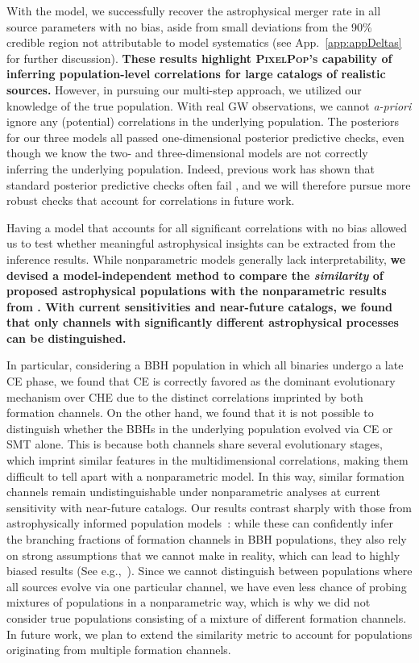 \begin{refsection}
With the \Hybrid model, we successfully recover the astrophysical merger rate in all source parameters with no bias, aside from small deviations from the 90\% credible region not attributable to model systematics (see App.~\ref{app:appDeltas} for further discussion). \textbf{These results highlight \textsc{PixelPop's} capability of inferring population-level correlations for large catalogs of realistic sources.} However, in pursuing our multi-step approach, we utilized our knowledge of the true population. With real \ac{GW} observations, we cannot \textit{a-priori} ignore any (potential) correlations in the underlying population. The posteriors for our three models all passed one-dimensional posterior predictive checks, even though we know the two- and three-dimensional \PixelPop models are not correctly inferring the underlying population. Indeed, previous work has shown that standard posterior predictive checks often fail \citep{Romero-Shaw:2022ctb, Miller:2024sui}, and we will therefore pursue more robust checks that account for correlations in future work.

Having a model that accounts for all significant correlations with no bias allowed us to test whether meaningful astrophysical insights can be extracted from the inference results. While nonparametric models generally lack interpretability, \textbf{we devised a model-independent method to compare the \textit{similarity} of proposed astrophysical populations with the nonparametric results from \PixelPop. With current sensitivities and near-future catalogs, we found that only channels with significantly different astrophysical processes can be distinguished.}

In particular, considering a \ac{BBH} population in which all binaries undergo a late \ac{CE} phase, we found that \ac{CE} is correctly favored as the dominant evolutionary mechanism over \ac{CHE} due to the distinct correlations imprinted by both formation channels. On the other hand, we found that it is not possible to distinguish whether the \acp{BBH} in the underlying population evolved via \ac{CE} or \ac{SMT} alone. This is because both channels share several evolutionary stages, which imprint similar features in the multidimensional correlations, making them difficult to tell apart with a nonparametric model. In this way, similar formation channels remain undistinguishable under nonparametric analyses at current sensitivity with near-future catalogs. Our results contrast sharply with those from astrophysically informed population models~\citep{Zevin:2020gbd, Colloms:2025hib}: while these can confidently infer the branching fractions of formation channels in \ac{BBH} populations, they also rely on strong assumptions that we cannot make in reality, which can lead to highly biased results (See e.g.,~\citet{Cheng:2023ddt}). Since we cannot distinguish between populations where all sources evolve via one particular channel, we have even less chance of probing mixtures of populations in a nonparametric way, which is why we did not consider true populations consisting of a mixture of different formation channels. In future work, we plan to extend the similarity metric to account for populations originating from multiple formation channels.


\end{refsection}
